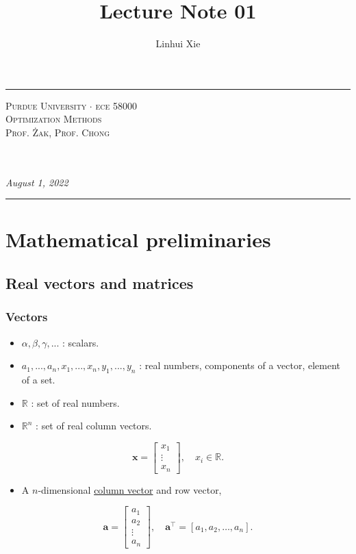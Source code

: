 \documentclass[12pt,thmsa]{article}
\author{Linhui Xie}
\title{Lecture Note 01}
\makeatletter
\def\maketitle{%
	\par
	\hrule height 1.5pt\vspace{1ex}
	\par\noindent
	
	\begin{minipage}{0.5\textwidth}
		\scshape
		Purdue University \(\cdot\) ece 58000 \\[1ex]
		Optimization Methods \\
		Prof. Żak, Prof. Chong
	\end{minipage}
	\begin{minipage}{0.45\textwidth}
		\raggedleft
		\MakeTextUppercase{{\@title}}\\[0.3ex] %
		\textit{\@author}\\[0.2ex]
		\textit{August 1, 2022}
	\end{minipage}
	\par\vspace{1ex}
	\hrule height 1.5pt\vspace{1ex}
	\par
}
\makeatother
\begin{document}
\maketitle

\section{Mathematical preliminaries}

\subsection{Real vectors and matrices}

\subsubsection{Vectors}
\begin{itemize}
	\item \(\alpha, \beta, \gamma, ...\) : scalars.
	\item \(a_1, ..., a_n, x_1, ..., x_n, y_1, ..., y_n\) : real numbers, components of a vector, element of a set.
	\item \(\mathbb{R}\) : set of real numbers.
	
	\item \(\mathbb{R}^{n}\) : set of real column vectors.
	
\end{itemize}

\begin{equation*}
	\boldsymbol{x}=\left[\begin{array}{c}
		x_{1} \\
		\vdots \\
		x_{n}
	\end{array}\right], \quad x_{i} \in \mathbb{R}.
\end{equation*}

\begin{itemize}
	\item A \(n\)-dimensional \underline{column vector} and row vector,
\end{itemize}

\begin{equation*}
	\boldsymbol{a}=\left[\begin{array}{c}
		a_{1} \\
		a_{2} \\
		\vdots \\
		a_{n}
	\end{array}\right], \quad \boldsymbol{a}^{\top}=\left[a_{1}, a_{2}, \ldots, a_{n}\right].
\end{equation*}
\end{document}
